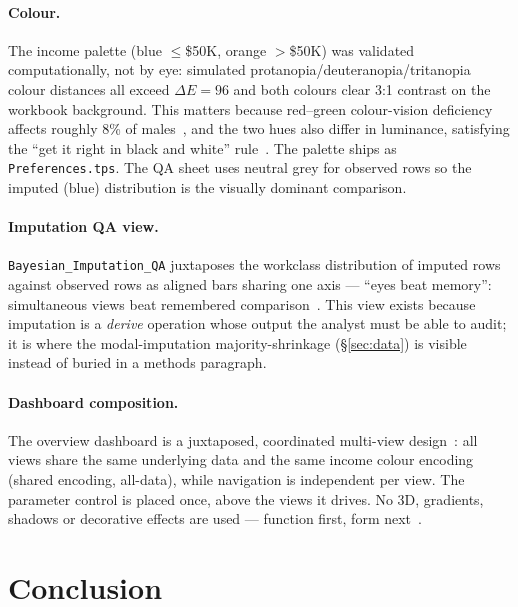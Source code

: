 \documentclass[11pt,a4paper]{article}
\begin{document}
\paragraph{Colour.}
The income palette (blue $\leq$\$50K, orange $>$\$50K) was validated
computationally, not by eye: simulated protanopia/deuteranopia/tritanopia
colour distances all exceed $\Delta E = 96$ and both colours clear 3:1
contrast on the workbook background. This matters because red--green
colour-vision deficiency affects roughly 8\% of males~\cite[p.~235]{munzner},
and the two hues also differ in luminance, satisfying the ``get it right in
black and white'' rule~\cite[p.~140]{munzner}. The palette ships as
\texttt{Preferences.tps}. The QA sheet uses neutral grey for observed rows
so the imputed (blue) distribution is the visually dominant comparison.

\paragraph{Imputation QA view.}
\texttt{Bayesian\_Imputation\_QA} juxtaposes the workclass distribution of
imputed rows against observed rows as aligned bars sharing one axis ---
``eyes beat memory'': simultaneous views beat remembered
comparison~\cite[\S6.5]{munzner}. This view exists because imputation is a
\emph{derive} operation whose output the analyst must be able to audit; it
is where the modal-imputation majority-shrinkage (\S\ref{sec:data}) is
visible instead of buried in a methods paragraph.

\paragraph{Dashboard composition.}
The overview dashboard is a juxtaposed, coordinated multi-view
design~\cite[Ch.~12]{munzner}: all views share the same underlying data and
the same income colour encoding (shared encoding, all-data), while
navigation is independent per view. The parameter control is placed once,
above the views it drives. No 3D, gradients, shadows or decorative effects
are used --- function first, form next~\cite[\S6.10]{munzner}.

\section{Conclusion}\label{sec:conclusion}
\end{document}
